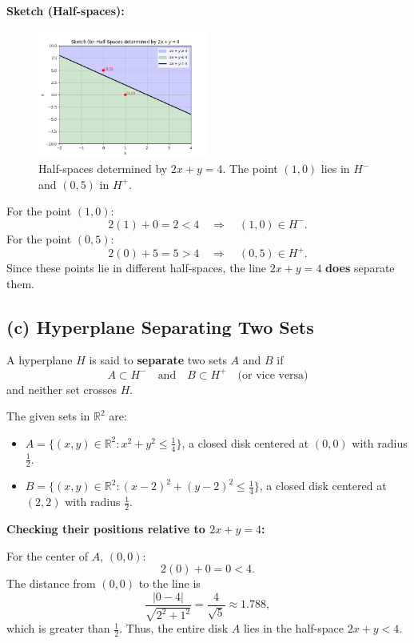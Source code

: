 \documentclass{article}
\begin{document}
\medskip
\textbf{Sketch (Half-spaces):}
\begin{figure}[H]
    \centering
    \includegraphics[width=0.5\textwidth]{b.png}
    \caption{Half-spaces determined by $2x+y=4$. The point $(1,0)$ lies in $H^-$ and $(0,5)$ in $H^+$.}
\end{figure}

For the point $(1,0)$:
\[
2(1)+0 = 2 < 4 \quad \Rightarrow \quad (1,0) \in H^-.
\]
For the point $(0,5)$:
\[
2(0)+5 = 5 > 4 \quad \Rightarrow \quad (0,5) \in H^+.
\]
Since these points lie in different half-spaces, the line $2x+y=4$ \textbf{does} separate them.

\subsection*{(c) Hyperplane Separating Two Sets}

A hyperplane $H$ is said to \textbf{separate} two sets $A$ and $B$ if
\[
A \subset H^- \quad \text{and} \quad B \subset H^+ \quad \text{(or vice versa)}
\]
and neither set crosses $H$.

The given sets in $\mathbb{R}^2$ are:
\begin{itemize}
    \item $A = \{(x,y) \in \mathbb{R}^2 : x^2+y^2 \le \tfrac{1}{4}\}$, a closed disk centered at $(0,0)$ with radius $\tfrac{1}{2}$.
    \item $B = \{(x,y) \in \mathbb{R}^2 : (x-2)^2+(y-2)^2 \le \tfrac{1}{4}\}$, a closed disk centered at $(2,2)$ with radius $\tfrac{1}{2}$.
\end{itemize}

\medskip
\textbf{Checking their positions relative to $2x+y=4$:}

For the center of $A$, $(0,0)$:
\[
2(0)+0 = 0 < 4.
\]
The distance from $(0,0)$ to the line is 
\[
\frac{|0-4|}{\sqrt{2^2+1^2}} = \frac{4}{\sqrt{5}} \approx 1.788,
\]
which is greater than $\tfrac{1}{2}$. Thus, the entire disk $A$ lies in the half-space $2x+y<4$.
\end{document}
